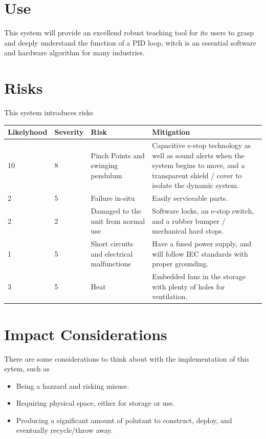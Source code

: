 \documentclass{article}
\begin{document}
\section{Use}

This system will provide an excellend robust teaching tool for its users to grasp and deeply
understand the function of a PID loop, witch is an essential software and hardware algorithm
for many industries.


\section{Risks}

This system introduces risks

\begin{tabular}{ |p{1.5cm}|p{1.5cm}||p{3cm}|p{6cm}|  }
    \hline
    Likelyhood & Severity & Risk                                       & Mitigation           \\
    \hline
    10         & 8        & Pinch Points and swinging pendulum         & Capacitive e-stop
    technology as well as sound alerts when the system begins to move, and a
    transparent shield / cover to isolate the dynamic system.                                 \\
    \hline
    2          & 5        & Failure in-situ                            & Easily serviceable
    parts.
    \\
    \hline
    2          & 2        & Damaged to the unit from normal use        & Software locks, an
    e-stop switch, and a rubber bumper / mechanical hard stops.
    \\
    \hline
    1          & 5        & Short circuits and electrical malfunctions & Have a fused power
    supply, and will follow IEC standards with proper grounding.
    \\
    \hline
    3          & 5        & Heat                                       & Embedded fans in the
    storage with plenty of holes for ventilation.
    \\
    \hline
\end{tabular}


\section{Impact Considerations}

There are some considerations to think about with the implementation of this
sytem, such as

\begin{itemize}
    \item Being a hazzard and risking misuse.
    \item Requiring physical space, either for storage or use.
    \item Producing a significant amount of polutant to construct, deploy, and
          eventually recycle/throw away.
\end{itemize}
\end{document}
